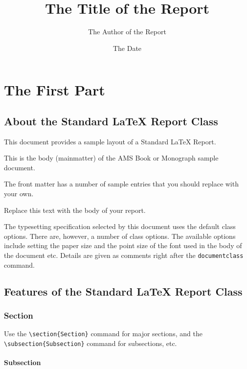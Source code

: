 \documentclass{report}%
\begin{document}
\title{The Title of the Report}
\author{The Author of the Report}
\date{The Date}
\maketitle
\tableofcontents

\part{The First Part}

\chapter{About the Standard LaTeX Report Class}

This document provides a sample layout of a Standard LaTeX Report.

This is the body (mainmatter) of the AMS Book or Monograph sample
document.

The front matter has a number of sample entries that you should
replace with your own.

Replace this text with the body of your report.

The typesetting specification selected by this document uses the
default class options. There are, however, a number of class
options. The available options include setting the paper size and
the point size of the font used in the body of the document etc.
Details are given as comments right after the \verb|documentclass|
command.

\chapter{Features of the Standard LaTeX Report Class}

\section{Section}

Use the \verb"\section{Section}" command for major sections, and
the \verb"\subsection{Subsection}" command for subsections, etc.

\subsection{Subsection}
\end{document}
